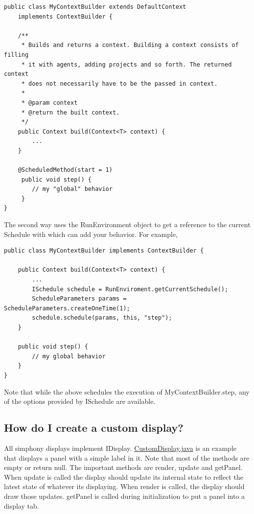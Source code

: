 \documentclass[11pt]{article}
\begin{document}
\noindent\begin{minipage}[h]{\textwidth}
\vspace{.2in}
\lstset{language=java}
\begin{lstlisting}
public class MyContextBuilder extends DefaultContext 
	implements ContextBuilder {

	/**
	 * Builds and returns a context. Building a context consists of filling 
	 * it with agents, adding projects and so forth. The returned context
	 * does not necessarily have to be the passed in context.
	 *
	 * @param context
	 * @return the built context.
	 */
	public Context build(Context<T> context) {
		...
	}
	
	@ScheduledMethod(start = 1)
	 public void step() {
	   	// my "global" behavior
	 }
}
\end{lstlisting}
\vspace{.2in}
\end{minipage}

The second way uses the RunEnvironment object to get a reference to the current Schedule with which can add your behavior. For example,

\noindent\begin{minipage}[h]{\textwidth}
\vspace{.2in}
\lstset{language=java}
\begin{lstlisting}
public class MyContextBuilder implements ContextBuilder {

	public Context build(Context<T> context) {
		...
		ISchedule schedule = RunEnviroment.getCurrentSchedule();
		ScheduleParameters params = ScheduleParameters.createOneTime(1);
		schedule.schedule(params, this, "step");
	}

 	public void step() {
   		// my global behavior
 	}
}
\end{lstlisting}
\vspace{.2in}
\end{minipage}

Note that while the above schedules the execution of MyContextBuilder.step, any of the options provided by ISchedule are available.

\subsection{How do I create a custom display?}
\label{prs:custom_display}

All simphony displays implement IDisplay. \href{https://repast.github.io/docs/CustomDisplay.java}{CustomDisplay.java} is an example that displays a panel with a simple label in it. Note that most of the methods are empty or return null. The important methods are render, update and getPanel. When update is called the display should update its internal state to reflect the latest state of whatever its displaying. When render is called, the display should draw those updates. getPanel is called during initialization to put a panel into a display tab.
\end{document}

